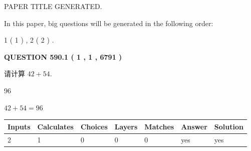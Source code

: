 \documentclass{ctexart}
\begin{document}
   
 \vspace{0.2in}
 
 
 
 
   
   
 PAPER TITLE GENERATED.
   
   
   
\vspace{0.2in}
   
In this paper, big questions will be generated in the following order: 
   
   
   1 ( 1 )
 ,
   2 ( 2 )
 .
  
\vspace{0.2in}
  
{\textbf{\Large{QUESTION
590.1 
 ( 1 , 1 , 6791 )
}}}
  
  
 
请计算 $ %
42 +  %
54 $.
 
 
 
\noindent{}
 
 

96
 
 
\noindent{}
 
 

 
 
 
\noindent{}
 
 

$ %
42 +  %
54=   %
96$
 
 
\noindent{}
 
 

 
   
   
   
   
\noindent\begin{tabular}{|l|l|l|l|l|l|l|}
 \hline
Inputs & Calculates & Choices & Layers & Matches & Answer & Solution \\ \hline
 2  & 
 1  & 
 0
  & 
 0  & 
 0  & 
  yes & 
  yes 
  \\ \hline
 \end{tabular}
   
   
   
   
\noindent{}
   
   
  
\end{document}
